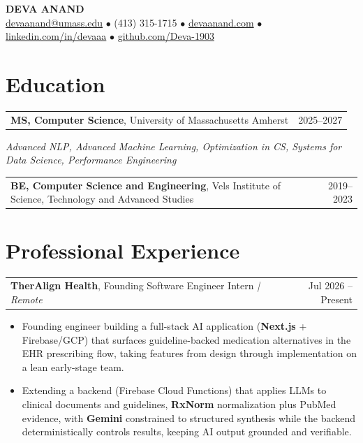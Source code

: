\documentclass[letterpaper,11pt]{article}
\makeatletter
\newcommand{\eduItem}[3]{%
  \begin{tabular*}{\textwidth}{@{}l@{\extracolsep{\fill}}r@{}}
    \textbf{#1}, #2 & #3 \\
  \end{tabular*}\par
}
\newcommand{\expItem}[4]{%
  \vspace{2pt}
  \begin{tabular*}{\textwidth}{@{}l@{\extracolsep{\fill}}r@{}}
    \textbf{#1}, #2 \textit{| #3} & #4 \\
  \end{tabular*}\par\vspace{-3pt}
}
\makeatother
\begin{document}
\begin{center}
    {\fontsize{18}{20}\selectfont\bfseries DEVA ANAND}\\ \vspace{3pt}
    {\small
    \href{mailto:devaanand@umass.edu}{devaanand@umass.edu}
    \enspace$\bullet$\enspace
    (413) 315-1715
    \enspace$\bullet$\enspace
    \href{https://devaanand.com}{devaanand.com}
    \enspace$\bullet$\enspace
    \href{https://linkedin.com/in/devaaa/}{linkedin.com/in/devaaa}
    \enspace$\bullet$\enspace
    \href{https://github.com/Deva-1903}{github.com/Deva-1903}}
\end{center}
\vspace{-8pt}

\section{Education}
\eduItem{MS, Computer Science}{University of Massachusetts Amherst}{2025--2027}
{\small\textit{Advanced NLP, Advanced Machine Learning, Optimization in CS, Systems for Data Science, Performance Engineering}}\par
\vspace{3pt}
\eduItem{BE, Computer Science and Engineering}{Vels Institute of Science, Technology and Advanced Studies}{2019--2023}

\section{Professional Experience}

\expItem{TherAlign Health}{Founding Software Engineer Intern}{Remote}{Jul 2026 -- Present}
\begin{itemize}
  \item Founding engineer building a full-stack AI application (\textbf{Next.js} + Firebase/GCP) that surfaces guideline-backed medication alternatives in the EHR prescribing flow, taking features from design through implementation on a lean early-stage team.
  \item Extending a backend (Firebase Cloud Functions) that applies LLMs to clinical documents and guidelines, \textbf{RxNorm} normalization plus PubMed evidence, with \textbf{Gemini} constrained to structured synthesis while the backend deterministically controls results, keeping AI output grounded and verifiable.
\end{itemize}
\end{document}
